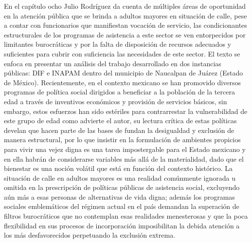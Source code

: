 \documentclass[
  spanish,
  11.5pt,
  170mm x 240mmpaper,
]{scrbook}
\begin{document}
En el capítulo ocho Julio Rodríguez da cuenta de múltiples áreas de
oportunidad en la atención pública que se brinda a adultos mayores en
situación de calle, pese a contar con funcionarios que manifiestan
vocación de servicio, las condicionantes estructurales de los programas
de asistencia a este sector se ven entorpecidos por limitantes
burocráticas y por la falta de disposición de recursos adecuados y
suficientes para cubrir con suficiencia las necesidades de este sector.
El texto se enfoca en presentar un análisis del trabajo desarrollado en
dos instancias públicas: DIF e INAPAM dentro del municipio de Naucalpan
de Juárez (Estado de México). Recientemente, en el contexto mexicano se
han promovido diversos programas de política social dirigidos a
beneficiar a la población de la tercera edad a través de inventivos
económicos y provisión de servicios básicos, sin embargo, estos
esfuerzos han sido estériles para contrarrestar la vulnerabilidad de
este grupo de edad como advierte el autor, su lectura crítica de estas
políticas develan que hacen parte de las bases de fundan la desigualdad
y exclusión de manera estructural, por lo que insistir en la formulación
de ambientes propicios para vivir una vejez digna es una tarea
impostergable para el Estado mexicano y en ella habrán de considerarse
variables más allá de la materialidad, dado que el bienestar es una
noción volátil que está en función del contexto histórico. La situación
de calle en adultos mayores es una realidad comúnmente ignorada u
omitida en la prescripción de políticas públicas de asistencia social,
excluyendo aún más a esas personas de alternativas de vida digna; además
los programas sociales emblemáticos del régimen actual en el país
demandan la superación de filtros burocráticos que no contemplan esas
realidades menesterosas y que la poca flexibilidad en sus procesos de
incorporación imposibilitan la debida atención a los más desfavorecidos
perpetuando la exclusión extrema.
\end{document}
